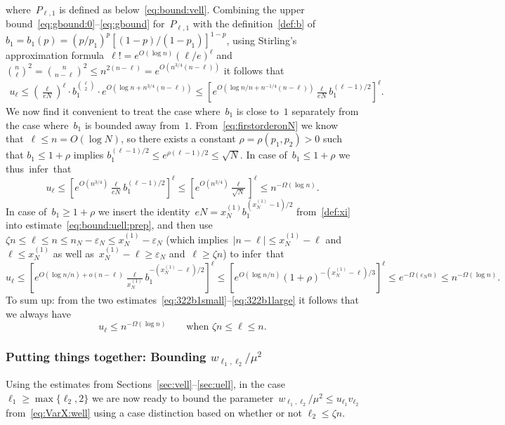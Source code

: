 \documentclass{article}
\newcommand{\eps}{\varepsilon}
\newcommand\lrpar[1]{\left(#1\right)}
\newcommand{\xone}{x^{(1)}}
\renewcommand{\u}{u}
\renewcommand{\v}{v}
\newcommand\lrsqpar[1]{\left[#1\right]}
\begin{document}
where~$P_{\ell,1}$ is defined as below~\eqref{eq:bound:vell}. 
Combining the upper bound~\eqref{eq:gbound:0}--\eqref{eq:gbound} for~$P_{\ell,1}$ with the definition~\eqref{def:b} of~${b_1=b_1(p)} = {(p/p_1)^p[(1-p)/(1-p_1)]^{1-p}}$,
using Stirling's approximation formula~$\ell! = e^{O(\log n)}(\ell/e)^{\ell}$ and~$\binom{n}{\ell}^2=\binom{n}{n-\ell}^2\le n^{2(n-\ell)}=e^{O(n^{3/4}(n-\ell))}$ it follows that  
\begin{align}\label{eq:bound:uell:prep}
    u_\ell 
 \le \lrpar{\tfrac{\ell}{eN}}^{\ell} \cdot b_1^{\binom{\ell}{2}} \cdot e^{O\lrpar{\log n+n^{3/4}(n-\ell)}} 
    \le \lrsqpar{e^{O\lrpar{\log n/n+n^{-1/4}(n-\ell)}} \tfrac{\ell}{eN} b_1^{(\ell-1)/2}  }^\ell .
\end{align}
We now find it convenient to treat the case where~$b_1$ is close to~$1$ separately from the case where~$b_1$ is bounded away from~$1$. 
From~\eqref{eq:firstorderonN} we know that~$\ell\le n=O(\log N)$, so there exists a constant $\rho=\rho(p_1,p_2)>0$ such that $b_1\le 1+\rho$ implies $b_1^{(\ell-1)/2}\le e^{\rho(\ell-1)/2}\le \sqrt{N}$.
In case of~$b_1\le 1+\rho$ we thus~infer~that 
\begin{equation}\label{eq:322b1small}
    u_\ell \le 
    \lrsqpar{e^{O(n^{3/4})} \tfrac{\ell}{eN} b_1^{(\ell-1)/2}  }^\ell\le \lrsqpar{ e^{O(n^{3/4})} \tfrac{\ell}{\sqrt{N}}}^\ell\le n^{-\Omega(\log n)}.
\end{equation} 
In case of~$b_1\ge 1+\rho$ we insert the identity~$eN = x^{(1)}_Nb_1^{(x^{(1)}_N-1)/2}$ from~\eqref{def:xi} 
into estimate~\eqref{eq:bound:uell:prep}, 
and then use ${\zeta n \le \ell\le n} \le {n_N-\eps_N} \le {\xone_N- \eps_N}$  
(which implies~$|n-\ell| \le \xone_N-\ell$ and~$\ell\le \xone_N$ as well as~$\xone_N-\ell \geq \eps_N$ and~$\ell \ge \zeta n$)
 to infer~that 
\begin{equation}\label{eq:322b1large}
u_\ell \le  \lrsqpar{e^{O(\log n/n)+o(n-\ell)} \tfrac{\ell}{x^{(1)}_N} b_1^{-(x^{(1)}_N-\ell)/2}  }^\ell
\le  \lrsqpar{e^{O(\log n/n)}  (1+\rho)^{-(x^{(1)}_N-\ell)/3} }^\ell 
\le e^{-\Omega(\eps_Nn)}\le n^{-\Omega(\log n)} .
\end{equation}
To sum up: from the two estimates~\eqref{eq:322b1small}--\eqref{eq:322b1large} it  follows that we always have 
\begin{equation}\label{eq:bestimate2}
 \u_{\ell} \leq n^{-\Omega(\log n)} \qquad \text{when~$\zeta n \le \ell \le n$.}
 \end{equation}



\subsubsection{Putting things together: Bounding $w_{\ell_1,\ell_2}/\mu^2$}\label{sec:well}
Using the estimates from Sections~\ref{sec:vell}--\ref{sec:uell}, 
in the case~$\ell_1\ge \max\{\ell_2,2\}$ we are now ready to bound the parameter~$w_{\ell_1,\ell_2}/\mu^2 \le \u_{\ell_1}\v_{\ell_2}$ from~\eqref{eq:VarX:well} using a case distinction based on whether or not $\ell_2\le \zeta n$. 
\end{document}
